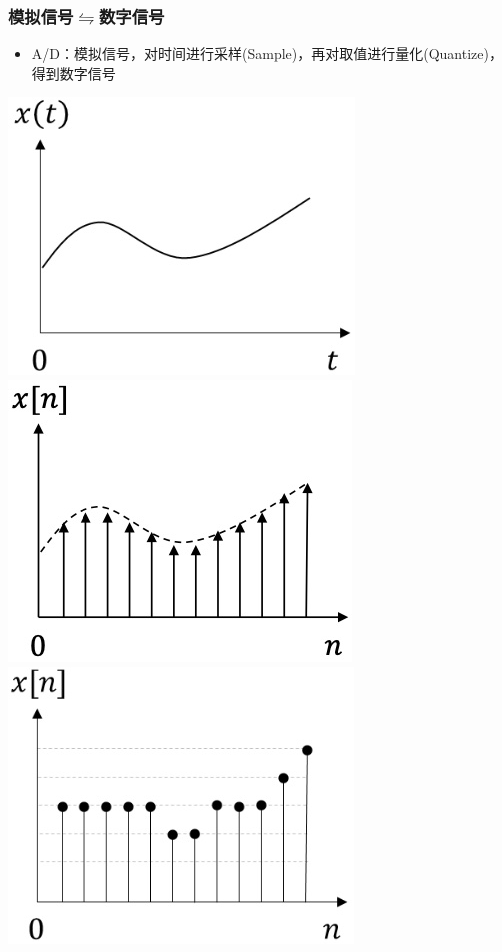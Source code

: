 \documentclass[CJKutf8,xcolor=pdftex,dvipsnames,table]{beamer}
\begin{document}
\begin{CJK*}{UTF8}{song}
  \begin{frame}
    \frametitle{模拟信号$\leftrightharpoons$数字信号} 
    \begin{itemize}
    \item A/D：模拟信号，对时间进行采样(Sample)，再对取值进行量化(Quantize)，得到数字信号
    \end{itemize}
	    \begin{center}
	    	\includegraphics[scale=0.3]{contisignal}  
			\hspace{1mm}
	    	\includegraphics[scale=0.3]{samplesignal}  
			\hspace{1mm}
	    	\includegraphics[scale=0.3]{discretesignal}    

\end{center}
\end{frame}
\end{CJK*}
\end{document}
